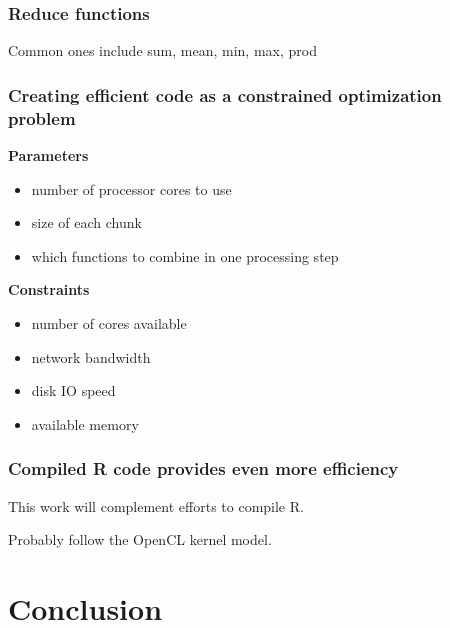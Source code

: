 \documentclass{beamer}
\begin{document}
\begin{frame}

    \frametitle{Reduce functions}

    Common ones include sum, mean, min, max, prod

\end{frame}
\begin{frame}

    \frametitle{Creating efficient code as a constrained optimization
    problem}

\textbf{Parameters}
\begin{itemize}
    \item number of processor cores to use
    \item size of each chunk
    \item which functions to combine in one processing step
\end{itemize}

\textbf{Constraints}
\begin{itemize}
    \item number of cores available
    \item network bandwidth
    \item disk IO speed
    \item available memory
\end{itemize}

\end{frame}
\begin{frame}

    \frametitle{Compiled R code provides even more efficiency}

    This work will complement efforts to compile R.

Probably follow the OpenCL kernel model.

\end{frame}
\section{Conclusion}
\end{document}
